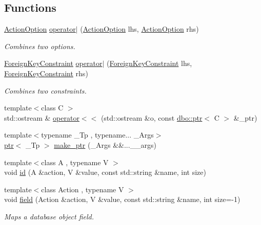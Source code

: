 \subsection*{Functions}
\begin{DoxyCompactItemize}
\item 
\hyperlink{classdbo_1_1_action_option}{Action\+Option} \hyperlink{namespacedbo_abe2d0bbeb466a0c67f66c1835ad3a4e9}{operator$\vert$} (\hyperlink{classdbo_1_1_action_option}{Action\+Option} lhs, \hyperlink{classdbo_1_1_action_option}{Action\+Option} rhs)
\begin{DoxyCompactList}\small\item\em Combines two options. \end{DoxyCompactList}\item 
\hyperlink{classdbo_1_1_foreign_key_constraint}{Foreign\+Key\+Constraint} \hyperlink{namespacedbo_ae5bf60d97447a53872534069944ba4a7}{operator$\vert$} (\hyperlink{classdbo_1_1_foreign_key_constraint}{Foreign\+Key\+Constraint} lhs, \hyperlink{classdbo_1_1_foreign_key_constraint}{Foreign\+Key\+Constraint} rhs)
\begin{DoxyCompactList}\small\item\em Combines two constraints. \end{DoxyCompactList}\item 
{\footnotesize template$<$class C $>$ }\\std\+::ostream \& \hyperlink{namespacedbo_a35fca6f52b51bacd907a2680d534ba1b}{operator$<$$<$} (std\+::ostream \&o, const \hyperlink{classdbo_1_1ptr}{dbo\+::ptr}$<$ C $>$ \&\+\_\+ptr)
\item 
{\footnotesize template$<$typename \+\_\+\+Tp , typename... \+\_\+\+Args$>$ }\\\hyperlink{classdbo_1_1ptr}{ptr}$<$ \+\_\+\+Tp $>$ \hyperlink{namespacedbo_ae23ac9fdb26d344155f3651112ac2f1a}{make\+\_\+ptr} (\+\_\+\+Args \&\&...\+\_\+\+\_\+args)
\item 
{\footnotesize template$<$class A , typename V $>$ }\\void \hyperlink{namespacedbo_a8d25907296ae8360b3120b7492022c1d}{id} (A \&action, V \&value, const std\+::string \&name, int size)
\item 
{\footnotesize template$<$class Action , typename V $>$ }\\void \hyperlink{namespacedbo_ad1f50f02cb050acf946807959252a93f}{field} (Action \&action, V \&value, const std\+::string \&name, int size=-\/1)
\begin{DoxyCompactList}\small\item\em Maps a database object field. \end{DoxyCompactList}\item 

\end{DoxyCompactItemize}
